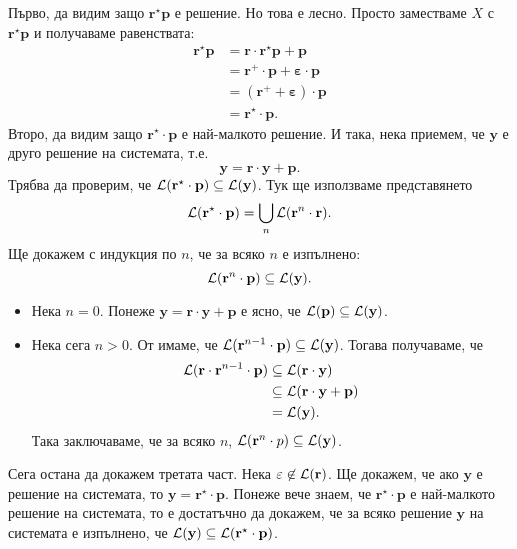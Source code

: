 \begin{hint}
  Първо, да видим защо $\mathbf{r}^\star \mathbf{p}$ е решение. Но това е лесно.
  Просто заместваме $X$ с $\mathbf{r}^\star \mathbf{p}$ и получаваме равенствата:
  \begin{align*}
    \mathbf{r}^\star \mathbf{p} & = \mathbf{r} \cdot \mathbf{r}^\star \mathbf{p} + \mathbf{p}\\
                                & = \mathbf{r}^+ \cdot \mathbf{p} + \mathbf{\varepsilon} \cdot \mathbf{p}\\
                                & = (\mathbf{r}^+ + \mathbf{\varepsilon}) \cdot \mathbf{p}\\
                                & = \mathbf{r}^\star \cdot \mathbf{p}.
  \end{align*}
  Второ, да видим защо $\mathbf{r}^\star \cdot \mathbf{p}$ е най-малкото решение.
  И така, нека приемем, че $\mathbf{y}$ е друго решение на системата, т.е.
  \[\mathbf{y} = \mathbf{r} \cdot \mathbf{y} + \mathbf{p}.\]
  Трябва да проверим, че $\mathcal{L}(\mathbf{r}^\star \cdot \mathbf{p}) \subseteq \mathcal{L}(\mathbf{y})$.
  Тук ще използваме представянето
  \[\mathcal{L}(\mathbf{r}^\star \cdot \mathbf{p}) = \bigcup_n \mathcal{L}(\mathbf{r}^n \cdot \mathbf{r}).\]
  Ще докажем с индукция по $n$, че за всяко $n$ е изпълнено:
  \[\mathcal{L}(\mathbf{r}^n \cdot \mathbf{p}) \subseteq \mathcal{L}(\mathbf{y}).\]           
  \begin{itemize}
  \item
    Нека $n = 0$. Понеже $\mathbf{y} = \mathbf{r} \cdot \mathbf{y} + \mathbf{p}$ е ясно, че $\mathcal{L}(\mathbf{p}) \subseteq \mathcal{L}(\mathbf{y})$.
  \item
    Нека сега $n > 0$. От \IndHyp имаме, че $\mathcal{L}(\mathbf{r}^{n-1} \cdot \mathbf{p}) \subseteq \mathcal{L}(\mathbf{y})$. Тогава получаваме, че
    \begin{align*}
      \mathcal{L}(\mathbf{r} \cdot \mathbf{r}^{n-1} \cdot \mathbf{p}) & \subseteq \mathcal{L}(\mathbf{r} \cdot \mathbf{y})\\
                                                             & \subseteq \mathcal{L}(\mathbf{r}\cdot\mathbf{y}+\mathbf{p})\\
                                                             & = \mathcal{L}(\mathbf{y}).
    \end{align*}
    Така заключаваме, че за всяко $n$, $\mathcal{L}(\mathbf{r}^n \cdot p) \subseteq \mathcal{L}(\mathbf{y})$.
  \end{itemize}

  Сега остана да докажем третата част. Нека $\varepsilon \not\in \mathcal{L}(\mathbf{r})$.
  Ще докажем, че ако $\mathbf{y}$ е решение на системата, то $\mathbf{y} = \mathbf{r}^\star \cdot \mathbf{p}$. Понеже вече знаем, че $\mathbf{r}^\star \cdot \mathbf{p}$ е най-малкото решение на системата, то е достатъчно да докажем, че за всяко решение $\mathbf{y}$ на системата е изпълнено, че $\mathcal{L}(\mathbf{y}) \subseteq \mathcal{L}(\mathbf{r}^\star \cdot \mathbf{p})$.


\end{hint}
